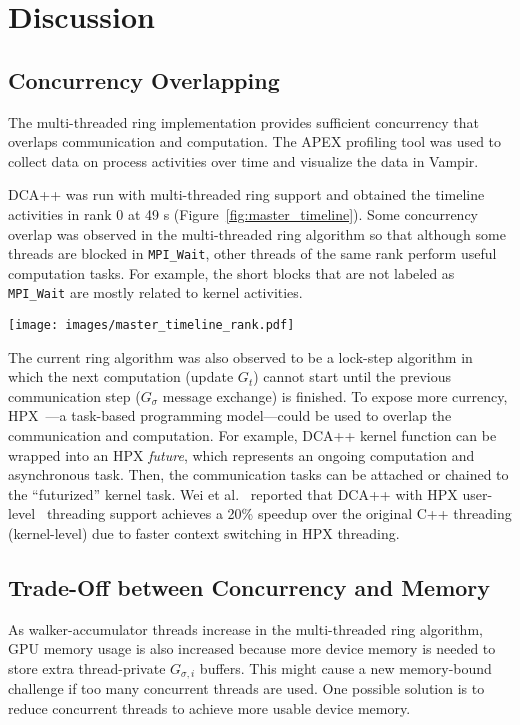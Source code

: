 \section{Discussion}
\label{sec:discussion}

\subsection{Concurrency Overlapping}
The multi-threaded ring implementation provides
sufficient concurrency that overlaps communication and computation.
%
The APEX profiling tool was used to collect data on process activities over time and visualize the data in Vampir.

DCA++ was run with multi-threaded ring support and obtained the timeline activities in rank 0 at 49 s (Figure~\ref{fig:master_timeline}). 
%
Some concurrency overlap was observed in the multi-threaded
ring algorithm so that although some threads are
blocked in \texttt{MPI\_Wait}, other threads of the same rank perform useful computation tasks.
%
For example, the short blocks that are not labeled as \texttt{MPI\_Wait} are mostly related to kernel activities.

\begin{figure*}
	\centering
	\texttt{[image: images/master\_timeline\_rank.pdf]}
	\caption{Vampir timeline graph shows the processes' activities over the time in rank 0 (DCA++ with multi-threaded ring algorithm).}
	\label{fig:master_timeline}
\end{figure*}

The current ring algorithm was also observed to be a lock-step algorithm in which the 
next computation (update $G_t$) cannot start until the previous 
communication step ($G_{\sigma}$ message exchange) is finished.
%
To expose more currency, HPX~\cite{Kaiser2020}---a task-based programming model---could be used to overlap the communication and computation.
%
For example, DCA++ kernel function can be wrapped into an HPX \textit{future}, which represents
an ongoing computation and asynchronous task. Then, the communication tasks can be attached or chained to the ``futurized'' kernel task. 
%
Wei et al.~\cite{dca_hpx_2020} reported that DCA++ with HPX user-level~\cite{hpxmp} threading 
support achieves a 20\% speedup over the original C++ threading (kernel-level) due to
faster context switching in HPX threading.

\subsection{Trade-Off between Concurrency and Memory}
As walker-accumulator threads increase in the
multi-threaded ring algorithm,
GPU memory usage is also increased because more device memory is needed to store extra thread-private $G_{\sigma,i}$ buffers. 
%
This might cause
a new memory-bound challenge if too many concurrent threads are used.
%
One possible solution is to reduce concurrent threads to achieve more usable device memory.
%

